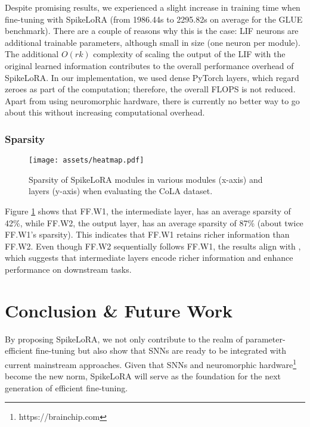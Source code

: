 \documentclass{article} %
\begin{document}
Despite promising results, we experienced a slight increase in training time when fine-tuning with SpikeLoRA (from 1986.44s to 2295.82s on average for the GLUE benchmark). There are a couple of reasons why this is the case: LIF neurons are additional trainable parameters, although small in size (one neuron per module). The additional \(O(rk)\) complexity of scaling the output of the LIF with the original learned information contributes to the overall performance overhead of SpikeLoRA. In our implementation, we used dense PyTorch layers, which regard zeroes as part of the computation; therefore, the overall FLOPS is not reduced. Apart from using neuromorphic hardware, there is currently no better way to go about this without increasing computational overhead.

\subsubsection{Sparsity}
\label{sparsity}
\begin{figure}[htbp]
  \centering
  \texttt{[image: assets/heatmap.pdf]}
  \caption{Sparsity of SpikeLoRA modules in various modules (x-axis) and layers (y-axis) when evaluating the CoLA dataset.}
  \label{fig:sparsity-heatmap}
\end{figure}

Figure \ref{fig:sparsity-heatmap} shows that FF.W1, the intermediate layer, has an average sparsity of 42\%, while FF.W2, the output layer, has an average sparsity of 87\% (about twice FF.W1's sparsity). This indicates that FF.W1 retains richer information than FF.W2. Even though FF.W2 sequentially follows FF.W1, the results align with \cite{skean_layer_2025}, which suggests that intermediate layers encode richer information and enhance performance on downstream tasks.


\section{Conclusion \& Future Work}
\label{conclusion}
By proposing SpikeLoRA, we not only contribute to the realm of parameter-efficient fine-tuning but also show that SNNs are ready to be integrated with current mainstream approaches. Given that SNNs and neuromorphic hardware\footnote{https://brainchip.com} become the new norm, SpikeLoRA will serve as the foundation for the next generation of efficient fine-tuning.
\end{document}
